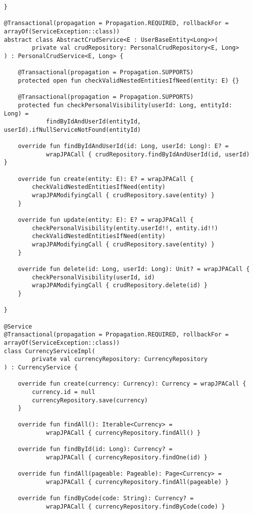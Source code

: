 \begin{lstlisting}[style = ktstyle]
}

@Transactional(propagation = Propagation.REQUIRED, rollbackFor = arrayOf(ServiceException::class))
abstract class AbstractCrudService<E : UserBaseEntity<Long>>(
        private val crudRepository: PersonalCrudRepository<E, Long>
) : PersonalCrudService<E, Long> {

    @Transactional(propagation = Propagation.SUPPORTS)
    protected open fun checkValidNestedEntitiesIfNeed(entity: E) {}

    @Transactional(propagation = Propagation.SUPPORTS)
    protected fun checkPersonalVisibility(userId: Long, entityId: Long) =
            findByIdAndUserId(entityId, userId).ifNullServiceNotFound(entityId)

    override fun findByIdAndUserId(id: Long, userId: Long): E? =
            wrapJPACall { crudRepository.findByIdAndUserId(id, userId) }

    override fun create(entity: E): E? = wrapJPACall {
        checkValidNestedEntitiesIfNeed(entity)
        wrapJPAModifyingCall { crudRepository.save(entity) }
    }

    override fun update(entity: E): E? = wrapJPACall {
        checkPersonalVisibility(entity.userId!!, entity.id!!)
        checkValidNestedEntitiesIfNeed(entity)
        wrapJPAModifyingCall { crudRepository.save(entity) }
    }

    override fun delete(id: Long, userId: Long): Unit? = wrapJPACall {
        checkPersonalVisibility(userId, id)
        wrapJPAModifyingCall { crudRepository.delete(id) }
    }

}

@Service
@Transactional(propagation = Propagation.REQUIRED, rollbackFor = arrayOf(ServiceException::class))
class CurrencyServiceImpl(
        private val currencyRepository: CurrencyRepository
) : CurrencyService {

    override fun create(currency: Currency): Currency = wrapJPACall {
        currency.id = null
        currencyRepository.save(currency)
    }

    override fun findAll(): Iterable<Currency> =
            wrapJPACall { currencyRepository.findAll() }

    override fun findById(id: Long): Currency? =
            wrapJPACall { currencyRepository.findOne(id) }

    override fun findAll(pageable: Pageable): Page<Currency> =
            wrapJPACall { currencyRepository.findAll(pageable) }

    override fun findByCode(code: String): Currency? =
            wrapJPACall { currencyRepository.findByCode(code) }


\end{lstlisting}
